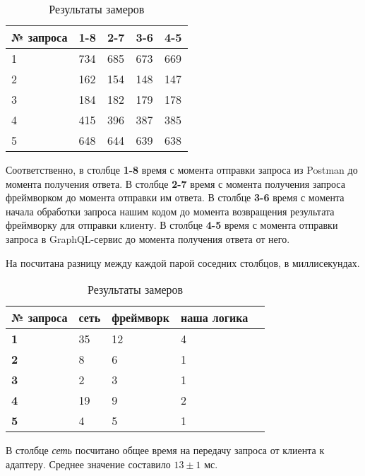 \noindent
\begingroup
\centering
\small %
\begin{table} [htbp]
	\centering\small
	\caption{Результаты замеров}%
	\label{tab:performance-slices}
	\begin{tabular}{|l|l|l|l|l|}
		\hline
		№ запроса & 1-8 & 2-7 & 3-6 & 4-5 \\ \hline
		\hline
		1 & 734 & 685 & 673 & 669 \\ \hline
		2 & 162 & 154 & 148 & 147 \\ \hline
		3 & 184 & 182 & 179 & 178 \\ \hline
		4 & 415 & 396 & 387 & 385 \\ \hline
		5 & 648 & 644 & 639 & 638 \\ \hline
	\end{tabular}
\end{table}
\normalsize
\endgroup

Соответственно, в столбце \textbf{1-8} время с момента отправки запроса из Postman до момента получения ответа.
В столбце \textbf{2-7} время с момента получения запроса фреймворком до момента отправки им ответа.
В столбце \textbf{3-6} время с момента начала обработки запроса нашим кодом до момента возвращения результата фреймворку для отправки клиенту.
В столбце \textbf{4-5} время с момента отправки запроса в GraphQL-сервис до момента получения ответа от него.

На  посчитана разницу между каждой парой соседних столбцов, в миллисекундах.

\noindent
\begingroup
\centering
\small %
\begin{table} [htbp]
	\centering\small
	\caption{Результаты замеров}%
	\label{tab:performance-slices-diff}
	\begin{tabular}{|l|l|l|l|l|}
		\hline
		\textbf{№ запроса} & \textbf{сеть} & \textbf{фреймворк} & \textbf{наша логика} \\ \hline
		\hline
		\textbf{1} & 35 & 12 &  4 \\ \hline
		\textbf{2} &  8 &  6 &  1 \\ \hline
		\textbf{3} &  2 &  3 &  1 \\ \hline
		\textbf{4} & 19 &  9 &  2 \\ \hline
		\textbf{5} &  4 &  5 &  1 \\ \hline
	\end{tabular}
\end{table}
\normalsize
\endgroup

В столбце \textit{сеть} посчитано общее время на передачу запроса от клиента к адаптеру.
Среднее значение составило $13±1$ мс.


